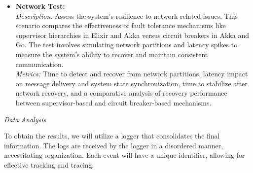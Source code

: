 \begin{itemize}
    \item \textbf{Network Test:} \\
    \textit{Description:} Assess the system's resilience to network-related issues. This scenario compares the effectiveness of fault tolerance mechanisms like supervisor hierarchies in Elixir and Akka versus circuit breakers in Akka and Go. The test involves simulating network partitions and latency spikes to measure the system's ability to recover and maintain consistent communication. \\
    \textit{Metrics:} Time to detect and recover from network partitions, latency impact on message delivery and system state synchronization, time to stabilize after network recovery, and a comparative analysis of recovery performance between supervisor-based and circuit breaker-based mechanisms.
\end{itemize}

\textit{\underline{Data Analysis}}

To obtain the results, we will utilize a logger that consolidates the final information. The logs are received by the logger in a disordered manner, necessitating organization. Each event will have a unique identifier, allowing for effective tracking and tracing.
